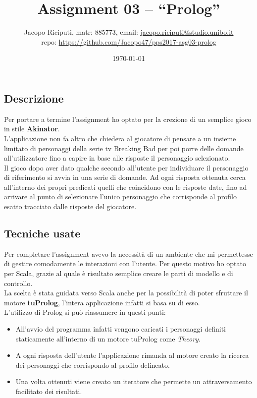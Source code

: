 \documentclass[10pt,english]{article}
\title{\vspace{-70pt}Assignment 03 -- ``Prolog''}
\author{Jacopo Riciputi, matr: 885773, email: {\url{jacopo.riciputi@studio.unibo.it}}\\ repo: {\url{https://github.com/Jacopo47/pps2017-asg03-prolog}} }
\date{\today}
\begin{document}
\maketitle
\vspace{-30pt}

\subsection{Descrizione}

Per portare a termine l'assignment ho optato per la crezione di un semplice gioco in stile \textbf{Akinator}. \\
L'applicazione non fa altro che chiedera al giocatore di pensare a un insieme limitato di personaggi della serie tv Breaking Bad per poi porre delle domande all'utilizzatore fino a capire in base alle risposte il personaggio selezionato. \\
Il gioco dopo aver dato qualche secondo all'utente per individuare il personaggio di riferimento si avvia in una serie di domande. 
Ad ogni risposta ottenuta cerca all'interno dei propri predicati quelli che coincidono con le risposte date, fino ad arrivare al punto di selezionare l'unico personaggio che corrisponde al profilo esatto tracciato dalle risposte del giocatore.


\subsection{Tecniche usate}
Per completare l'assignment avevo la necessità di un ambiente che mi permettesse di gestire comodamente le interazioni con l'utente.
Per questo motivo ho optato per Scala, grazie al quale è risultato semplice creare le parti di modello e di controllo. \\
La scelta è stata guidata verso Scala anche per la possibilità di poter sfruttare il motore \textbf{tuProlog}, l'intera applicazione infatti si basa su di esso. \\

L'utilizzo di Prolog si può riassumere in questi punti: 
  \begin{itemize}
   \item All'avvio del programma infatti vengono caricati i personaggi definiti staticamente all'interno di un motore tuProlog come \textit{Theory}.
   \item A ogni risposta dell'utente l'applicazione rimanda al motore creato la ricerca dei personaggi che corrispondo al profilo delineato. 
   \item Una volta ottenuti viene creato un iteratore che permette un attraversamento facilitato dei risultati. 
  \end{itemize}
\end{document}
